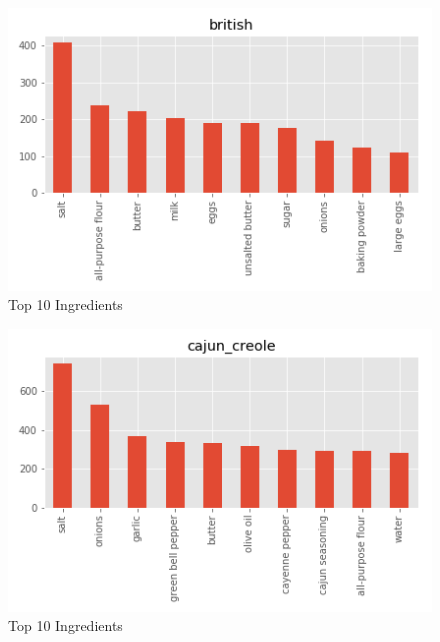 \documentclass[sigconf]{acmart}
\begin{document}
\begin{figure}[!ht]
  \centering\includegraphics[width=\columnwidth]{images/british_10_most_used_ingredients.png}
  \caption{Top 10 Ingredients }\label{f:british_10_most_used_ingredients}
\end{figure}

\begin{figure}[!ht]
  \centering\includegraphics[width=\columnwidth]{images/cajun_creole_10_most_used_ingredients.png}
  \caption{Top 10 Ingredients }\label{f:cajun_creole_10_most_used_ingredients}
\end{figure}
\end{document}
